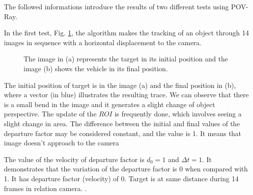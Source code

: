 The followed informations introduce the results of two different tests 
using POV-Ray.

In the first test, Fig. \ref{fig:imgpapercerta}, 
the algorithm makes the tracking of an object through 14 images in sequence with 
a horizontal displacement to the camera.

\begin{figure}[H]
\centering
  \caption{The image in (a) represents the target in its initial position 
   and the image (b) shows the vehicle in its final position.}
  \label{fig:imgpapercerta}
\end{figure}

The initial position of target is in the image (a) and the final position in (b), 
where a vector (in blue) illustrates the resulting trace.
We can observe that there is a small bend in the image 
and it generates a slight change of object perspective. 
The update of the $ROI$ is frequently done, which involves seeing a slight change in area.
The difference between the initial and final values of the departure factor may 
be considered constant, and the value is 1. It means that image doesn't approach to the camera


The value of the velocity of departure factor is $d_0=1$ and $\Delta t=1$. 
It demonstrates that the variation
of the departure factor is 0 when compared with 1. 
It has departure factor (velocity) of $0$. Target is at same distance 
during 14 frames in relation camera.
.

